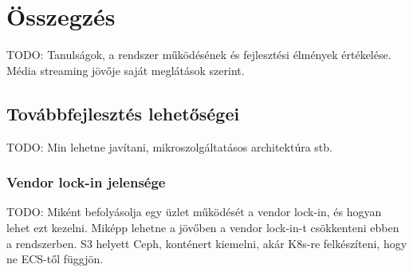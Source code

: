 \chapter{Összegzés}

TODO: Tanulságok, a rendszer működésének és fejlesztési élmények értékelése. Média streaming jövője saját meglátások szerint.

\section{Továbbfejlesztés lehetőségei}

TODO: Min lehetne javítani, mikroszolgáltatásos architektúra stb.

\subsection{Vendor lock-in jelensége}

TODO: Miként befolyásolja egy üzlet működését a vendor lock-in, és hogyan lehet ezt kezelni. Miképp lehetne a jövőben a vendor lock-in-t csökkenteni ebben a rendszerben. S3 helyett Ceph, konténert kiemelni, akár K8s-re felkészíteni, hogy ne ECS-től függjön.
